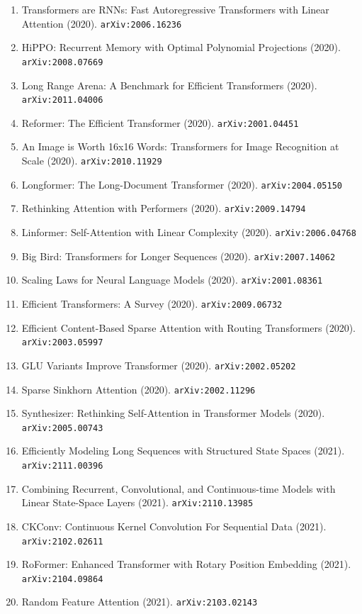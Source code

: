 \documentclass[11pt]{article}
\begin{document}
\begin{enumerate}
  \item Transformers are RNNs: Fast Autoregressive Transformers with Linear
  Attention (2020). \texttt{arXiv:2006.16236}
  \item HiPPO: Recurrent Memory with Optimal Polynomial Projections (2020). \texttt{arXiv:2008.07669}
  \item Long Range Arena: A Benchmark for Efficient Transformers (2020). \texttt{arXiv:2011.04006}
  \item Reformer: The Efficient Transformer (2020). \texttt{arXiv:2001.04451}
  \item An Image is Worth 16x16 Words: Transformers for Image Recognition at
  Scale (2020). \texttt{arXiv:2010.11929}
  \item Longformer: The Long-Document Transformer (2020). \texttt{arXiv:2004.05150}
  \item Rethinking Attention with Performers (2020). \texttt{arXiv:2009.14794}
  \item Linformer: Self-Attention with Linear Complexity (2020). \texttt{arXiv:2006.04768}
  \item Big Bird: Transformers for Longer Sequences (2020). \texttt{arXiv:2007.14062}
  \item Scaling Laws for Neural Language Models (2020). \texttt{arXiv:2001.08361}
  \item Efficient Transformers: A Survey (2020). \texttt{arXiv:2009.06732}
  \item Efficient Content-Based Sparse Attention with Routing Transformers (2020). \texttt{arXiv:2003.05997}
  \item GLU Variants Improve Transformer (2020). \texttt{arXiv:2002.05202}
  \item Sparse Sinkhorn Attention (2020). \texttt{arXiv:2002.11296}
  \item Synthesizer: Rethinking Self-Attention in Transformer Models (2020). \texttt{arXiv:2005.00743}
  \item Efficiently Modeling Long Sequences with Structured State Spaces (2021). \texttt{arXiv:2111.00396}
  \item Combining Recurrent, Convolutional, and Continuous-time Models with
  Linear State-Space Layers (2021). \texttt{arXiv:2110.13985}
  \item CKConv: Continuous Kernel Convolution For Sequential Data (2021). \texttt{arXiv:2102.02611}
  \item RoFormer: Enhanced Transformer with Rotary Position Embedding (2021). \texttt{arXiv:2104.09864}
  \item Random Feature Attention (2021). \texttt{arXiv:2103.02143}

\end{enumerate}
\end{document}
